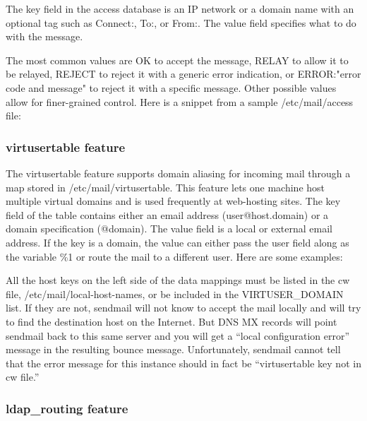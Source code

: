 The key field in the access database is an IP network or a domain name
with an optional tag such as {Connect:}, {To:,} or {From:}. The value
field specifies what to do with the message.

The most common values are {OK} to accept the message, {RELAY} to allow
it to be relayed, {REJECT} to reject it with a generic error indication,
or {ERROR:"}{error code and message}{"} to reject it with a specific
message. Other possible values allow for finer-grained control. Here is
a snippet from a sample {/etc/mail/access} file:


\subsubsection[{virtusertable}
feature]{\texorpdfstring{\protect\hypertarget{part0026_split_034.htmlux5cux23_idTextAnchor1079}{}{}\protect\hypertarget{part0026_split_034.htmlux5cux23_idIndexMarker2525}{}{}{virtusertable}
feature}{virtusertable feature}}

\protect\hypertarget{part0026_split_034.htmlux5cux23_idIndexMarker2526}{}{}The
{virtusertable} feature supports domain aliasing for incoming mail
through a map stored in {/etc/mail/virtusertable}. This feature lets one
machine host multiple virtual domains and is used frequently at
web-hosting sites. The key field of the table contains either an email
address ({user@host.domain}) or a domain specification ({@domain}). The
value field is a local or external email address. If the key is a
domain, the value can either pass the {user} field along as the variable
{\%1} or route the mail to a different user. Here are some examples:


All the host keys on the left side of the data mappings must be listed
in the {cw} file, {/etc/mail/local-host-names}, or be included in the
{VIRTUSER\_DOMAIN} list. If they are not, {sendmail} will not know to
accept the mail locally and will try to find the destination host on the
Internet. But DNS MX records will point {sendmail} back to this same
server and you will get a ``local configuration error'' message in the
resulting bounce message. Unfortunately, {sendmail} cannot tell that the
error message for this instance should in fact be ``virtusertable key
not in cw file.''

\subsubsection[
feature]{\texorpdfstring{\protect\hypertarget{part0026_split_034.htmlux5cux23_idTextAnchor1080}{}{}\protect\hypertarget{part0026_split_034.htmlux5cux23_idIndexMarker2527}{}{}\protect\hypertarget{part0026_split_034.htmlux5cux23_idIndexMarker2528}{}{}{ldap\_rou\protect\hypertarget{part0026_split_034.htmlux5cux23_idTextAnchor1081}{}{}ting}
feature}{ldap\_routing feature}}

